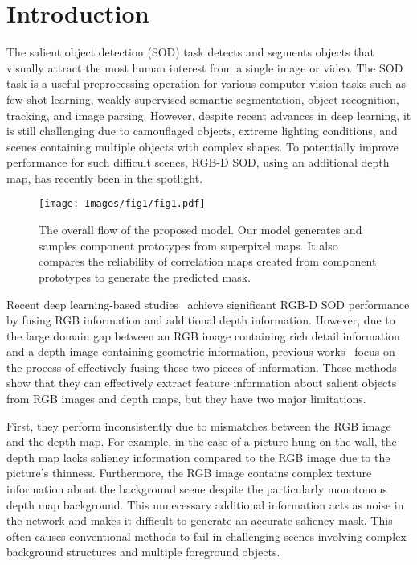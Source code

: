 \documentclass[runningheads]{llncs}
\begin{document}
	
	\section{Introduction}
	The salient object detection (SOD) task detects and segments objects that visually attract the most human interest from a single image or video. The SOD task is a useful preprocessing operation for various computer vision tasks such as few-shot learning, weakly-supervised semantic segmentation, object recognition, tracking, and image parsing. However, despite recent advances in deep learning, it is still challenging due to camouflaged objects, extreme lighting conditions, and scenes containing multiple objects with complex shapes. To potentially improve performance for such difficult scenes, RGB-D SOD, using an additional depth map, has recently been in the spotlight.
	
	\begin{figure}[t]
		\setlength{\belowcaptionskip}{-24pt}
		\begin{center}
			\texttt{[image: Images/fig1/fig1.pdf]}
			\caption{The overall flow of the proposed model. Our model generates and samples component prototypes from superpixel maps. It also compares the reliability of correlation maps created from component prototypes to generate the predicted mask.}
			\label{fig:intro}
		\end{center}
	\end{figure}
	
	Recent deep learning-based studies~\cite{chen2017m,chen2018progressively,chen2018attention,zhao2019contrast,fu2020jl} achieve significant RGB-D SOD performance by fusing RGB information and additional depth information. However, due to the large domain gap between an RGB image containing rich detail information and a depth image containing geometric information, previous works~\cite{chen2018progressively,chen2019three,qu2017rgbd,song2017depth,fan2020rethinking,piao2019depth} focus on the process of effectively fusing these two pieces of information. These methods show that they can effectively extract feature information about salient objects from RGB images and depth maps, but they have two major limitations.
	
	First, they perform inconsistently due to mismatches between the RGB image and the depth map. For example, in the case of a picture hung on the wall, the depth map lacks saliency information compared to the RGB image due to the picture’s thinness. Furthermore, the RGB image contains complex texture information about the background scene despite the particularly monotonous depth map background. This unnecessary additional information acts as noise in the network and makes it difficult to generate an accurate saliency mask. This often causes conventional methods to fail in challenging scenes involving complex background structures and multiple foreground objects. 
	
\end{document}
